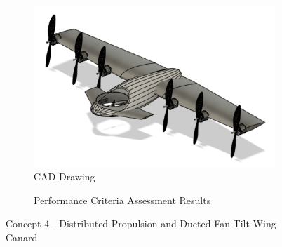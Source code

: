 

\begin{figure}[H]
\centering
\begin{subfigure}[t]{.5\textwidth}
  \centering
  \includegraphics[width=0.9\linewidth]{Concepts/CAD/8cad.png}
  \vspace{0.125cm}
  \caption{CAD Drawing}
  \label{fig:cad4}
\end{subfigure}%
\begin{subfigure}[t]{.5\textwidth}
  \centering
  \caption{Performance Criteria Assessment Results}
  \label{fig:radar4}
\end{subfigure}
\caption{Concept 4 - Distributed Propulsion and Ducted Fan Tilt-Wing Canard}
\label{fig:concept4}
\end{figure}

